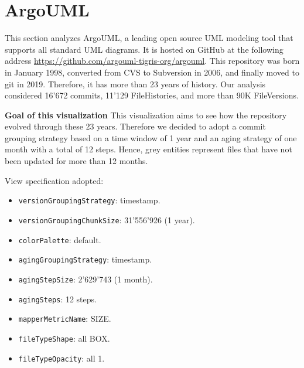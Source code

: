 \section{ArgoUML}
This section analyzes ArgoUML, a leading open source UML modeling tool that supports all standard UML diagrams. 
It is hosted on GitHub at the following address \url{https://github.com/argouml-tigris-org/argouml}. 
This repository was born in January 1998, converted from CVS to Subversion in 2006, and finally moved to git in 2019.
Therefore, it has more than 23 years of history. 
Our analysis considered 16'672 commits, 11'129 FileHistories, and more than 90K FileVersions. 

\label{subsec:view4}
\textbf{Goal of this visualization}
This visualization aims to see how the repository evolved through these 23 years. Therefore we decided to adopt a commit grouping strategy based on a time window of 1 year and an aging strategy of one month with a total of 12 steps. Hence, grey entities represent files that have not been updated for more than 12 months. 

\bigbreak
View specification adopted: 
\begin{itemize}
    \item \texttt{versionGroupingStrategy}: timestamp.
    \item \texttt{versionGroupingChunkSize}: 31'556'926 (1 year). 
    \item \texttt{colorPalette}: default.
    \item \texttt{agingGroupingStrategy}: timestamp.
    \item \texttt{agingStepSize}: 2'629'743 (1 month).
    \item \texttt{agingSteps}: 12 steps.
    \item \texttt{mapperMetricName}: SIZE. 
    \item \texttt{fileTypeShape}: all BOX. 
    \item \texttt{fileTypeOpacity}: all 1. 
\end{itemize}

